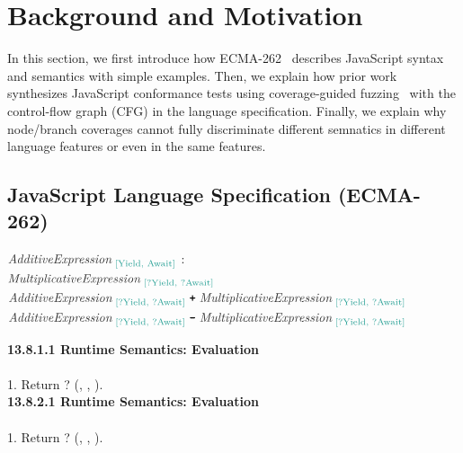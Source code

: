 \section{Background and Motivation}\label{sec:motivation}

In this section, we first introduce how ECMA-262~\cite{es13} describes
JavaScript syntax and semantics with simple examples.
%
Then, we explain how prior work synthesizes JavaScript conformance tests using
coverage-guided fuzzing~\cite{afl} with the control-flow graph (CFG) in the
language specification.
%
Finally, we explain why node/branch coverages cannot fully discriminate
different semnatics in different language features or even in the same features.

\subsection{JavaScript Language Specification (ECMA-262)}

\noindent
$\esntp{AdditiveExpression}{Yield, Await}$ :
\\%
\indent $\esntp{MultiplicativeExpression}{?Yield, ?Await}$
\\%
\indent $\esntp{AdditiveExpression}{?Yield, ?Await} \; \est{+} \;
\esntp{MultiplicativeExpression}{?Yield, ?Await}$
\\%
\indent $\esntp{AdditiveExpression}{?Yield, ?Await} \; \est{-} \;
\esntp{MultiplicativeExpression}{?Yield, ?Await}$

\noindent
\textbf{13.8.1.1 Runtime Semantics: Evaluation}
\\%
 \est{:}  \est{+}
\vspace*{.5em}\\%
1. Return ?
(,
\escode{+}, ).
\\%

\noindent
\textbf{13.8.2.1 Runtime Semantics: Evaluation}
\vspace*{.5em}\\%
 \est{:}  \est{-}
\vspace*{.5em}\\%
1. Return ?
(,
\escode{-}, ).
\\%

